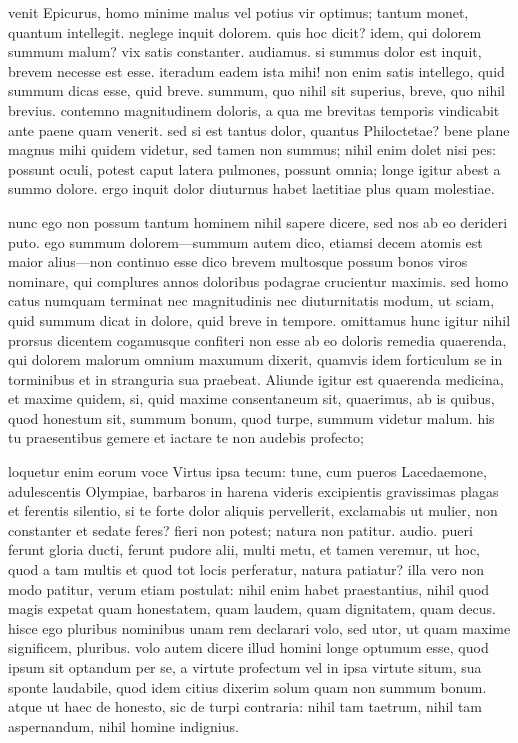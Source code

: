  venit Epicurus, homo minime malus vel potius vir optimus; tantum monet, quantum intellegit. neglege inquit dolorem. quis hoc dicit? idem, qui dolorem summum malum? vix satis constanter. audiamus. si summus dolor est inquit, brevem necesse est esse. iteradum eadem ista mihi! non enim satis intellego, quid summum dicas esse, quid breve. summum, quo nihil sit superius, breve, quo nihil brevius. contemno magnitudinem doloris, a qua me brevitas temporis vindicabit ante paene quam venerit. sed si est tantus dolor, quantus Philoctetae? bene plane magnus mihi quidem videtur, sed tamen non summus; nihil enim dolet nisi pes: possunt oculi, potest caput latera pulmones, possunt omnia; longe igitur abest a summo dolore. ergo inquit dolor diuturnus habet laetitiae plus quam molestiae.

 nunc ego non possum tantum hominem nihil sapere dicere, sed nos ab eo derideri puto. ego summum dolorem—summum autem dico, etiamsi decem atomis est maior alius—non continuo esse dico brevem multosque possum bonos viros nominare, qui complures annos doloribus podagrae crucientur maximis. sed homo catus numquam terminat nec magnitudinis nec diuturnitatis modum, ut sciam, quid summum dicat in dolore, quid breve in tempore. omittamus hunc igitur nihil prorsus dicentem cogamusque confiteri non esse ab eo doloris remedia quaerenda, qui dolorem malorum omnium maxumum dixerit, quamvis idem forticulum se in torminibus et in stranguria sua praebeat. Aliunde igitur est quaerenda medicina, et maxime quidem, si, quid maxime consentaneum sit, quaerimus, ab is quibus, quod honestum sit, summum bonum, quod turpe, summum videtur malum. his tu praesentibus gemere et iactare te non audebis profecto;

 loquetur enim eorum voce Virtus ipsa tecum: tune, cum pueros Lacedaemone, adulescentis Olympiae, barbaros in harena videris excipientis gravissimas plagas et ferentis silentio, si te forte dolor aliquis pervellerit, exclamabis ut mulier, non constanter et sedate feres? fieri non potest; natura non patitur. audio. pueri ferunt gloria ducti, ferunt pudore alii, multi metu, et tamen veremur, ut hoc, quod a tam multis et quod tot locis perferatur, natura patiatur? illa vero non modo patitur, verum etiam postulat: nihil enim habet praestantius, nihil quod magis expetat quam honestatem, quam laudem, quam dignitatem, quam decus. hisce ego pluribus nominibus unam rem declarari volo, sed utor, ut quam maxime significem, pluribus. volo autem dicere illud homini longe optumum esse, quod ipsum sit optandum per se, a virtute profectum vel in ipsa virtute situm, sua sponte laudabile, quod idem citius dixerim solum quam non summum bonum. atque ut haec de honesto, sic de turpi contraria: nihil tam taetrum, nihil tam aspernandum, nihil homine indignius.

